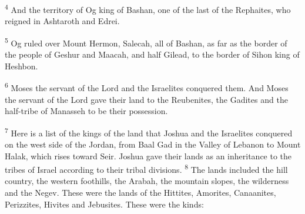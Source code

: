 \documentclass[12pt,twoside]{article}
\newcommand{\vs}[1]{\textsuperscript{#1}}
\begin{document}
\noindent \vs{4} And the territory of Og king of Bashan, one of the last of the Rephaites, who reigned in Ashtaroth and Edrei.\vspace{0.3cm}

\begin{adjustwidth}{0.5cm}{0cm}
  \vs{5} Og ruled over Mount Hermon, Salecah, all of Bashan, as far as the border of the people of Geshur and Maacah, and half Gilead, to the border of Sihon king of Heshbon.\vspace{0.3cm}
\end{adjustwidth}

\vs{6} Moses the servant of the Lord and the Israelites conquered them. And Moses the servant of the Lord gave their land to the Reubenites, the Gadites and the half-tribe of Manasseh to be their possession.

\vs{7} Here is a list of the kings of the land that Joshua and the Israelites conquered on the west side of the Jordan, from Baal Gad in the Valley of Lebanon to Mount Halak, which rises toward Seir. Joshua gave their lands as an inheritance to the tribes of Israel according to their tribal divisions.
\vs{8} The lands included the hill country, the western foothills, the Arabah, the mountain slopes, the wilderness and the Negev. These were the lands of the Hittites, Amorites, Canaanites, Perizzites, Hivites and Jebusites. These were the kinds:\vspace{0.3cm}
\end{document}
